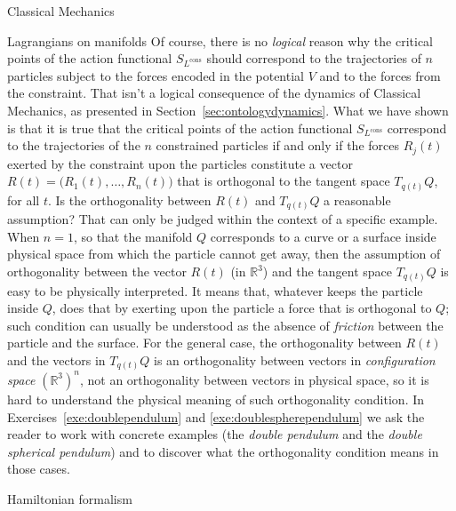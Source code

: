 \documentclass[oneside,a4paper,11pt]{amsbook}
\newcommand{\R}{\mathds R}
\theoremstyle{remark}\newtheorem{exercise}{Exercise}[chapter]
\theoremstyle{plain}\newtheorem{teo}{Theorem}[section]
\theoremstyle{plain}\newtheorem{lem}[teo]{Lemma}
\theoremstyle{plain}\newtheorem{prop}[teo]{Proposition}
\theoremstyle{plain}\newtheorem{cor}[teo]{Corollary}
\theoremstyle{definition}\newtheorem{defin}[teo]{Definition}
\theoremstyle{remark}\newtheorem{rem}[teo]{Remark}
\theoremstyle{definition}\newtheorem{notation}[teo]{Notation}
\theoremstyle{definition}\newtheorem{convention}[teo]{Convention}
\theoremstyle{definition}\newtheorem{example}[teo]{Example}
\numberwithin{section}{chapter}
\numberwithin{equation}{section}
\begin{document}
\begin{chapter}{Classical Mechanics}
\begin{section}{Lagrangians on manifolds}
Of course, there is no {\em logical\/} reason why the critical points of the action functional $S_{L^{\mathrm{cons}}}$
should correspond to the trajectories of $n$ particles subject to the forces encoded in the potential $V$ and to the forces from
the constraint. That isn't a logical consequence of the dynamics of Classical Mechanics, as presented in Section~\ref{sec:ontologydynamics}.
What we have shown is that it is true that the critical points of the action functional $S_{L^{\mathrm{cons}}}$ correspond to the trajectories
of the $n$ constrained particles if and only if the forces $R_j(t)$ exerted by the constraint upon the particles
constitute a vector $R(t)=\big(R_1(t),\ldots,R_n(t)\big)$ that is orthogonal to the tangent space $T_{q(t)}Q$, for all $t$.
Is the orthogonality between $R(t)$ and $T_{q(t)}Q$ a reasonable assumption? That can only be judged within the context
of a specific example. When $n=1$, so that the manifold $Q$ corresponds to a curve or a surface inside physical space
from which the particle cannot get away, then the assumption of orthogonality between the vector $R(t)$ (in $\R^3$)
and the tangent space $T_{q(t)}Q$ is easy to be physically interpreted. It means that, whatever keeps the particle
inside $Q$, does that by exerting upon the particle a force that is orthogonal to $Q$; such condition can usually be
understood as the absence of {\em friction\/} between the particle and the surface. For the general case, the orthogonality
between $R(t)$ and the vectors in $T_{q(t)}Q$ is an orthogonality between vectors in {\em configuration space\/}
$(\R^3)^n$, not an orthogonality between vectors in physical space, so it is hard to understand the physical meaning
of such orthogonality condition. In Exercises~\ref{exe:doublependulum} and \ref{exe:doublespherependulum}
we ask the reader to work with concrete examples (the {\em double pendulum\/} and the {\em double spherical pendulum})
and to discover what the orthogonality condition means in those cases.

\end{section}

\begin{section}{Hamiltonian formalism}
\label{sec:Hamformalism}


\end{section}
\end{chapter}
\end{document}
